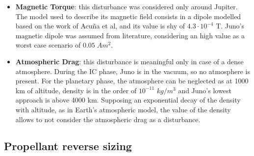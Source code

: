 \begin{itemize}
    \item \textbf{Magnetic Torque}: this disturbance was considered only around Jupiter. The model used to describe its magnetic field consists in a dipole modelled based on the work of Acuña et al\cite{jupiter_mag_field}, and its value is shy of $4.3\cdot 10^{-4}$ T. Juno's magnetic dipole was assumed from literature, considering an high value as a worst case scenario of $0.05 \; Am^2$.
    
    \item \textbf{Atmospheric Drag}: this disturbance is meaningful only in case of a dense atmosphere. During the IC phase, Juno is in the vacuum, so no atmosphere is present. For the planetary phase, the atmosphere can be neglected as at 1000 km of altitude, density is in the order of $10^{-11}$ $kg/m^3$ and Juno's lowest approach is above 4000 km. Supposing an exponential decay of the density with altitude, as in Earth's atmospheric model, the value of the density allows to not consider the atmospheric drag as a disturbance\cite{jupiter_density}.
    
        
\end{itemize}

\subsection{Propellant reverse sizing}
\label{subsec:prop_rev_sizing}

